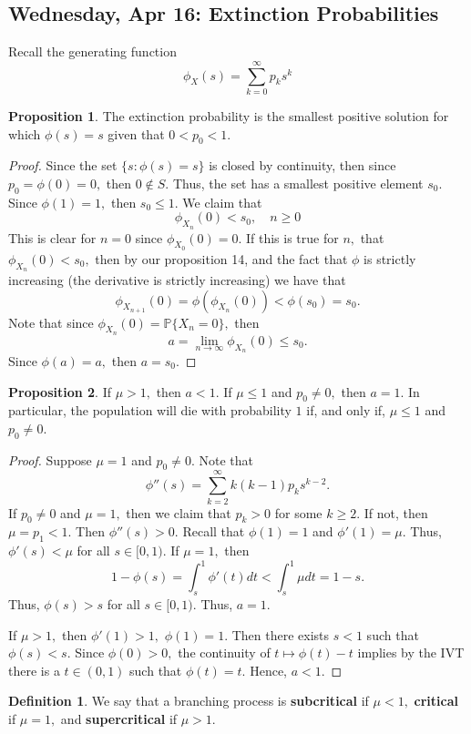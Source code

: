 \documentclass[10pt, oneside]{article}
\newcommand{\bbP}{\mathbb{P}}
\theoremstyle{definition}
\newtheorem{defn}{Definition}
\newtheorem{prop}{Proposition}
\begin{document}
\subsection{Wednesday, Apr 16: Extinction Probabilities}
Recall the generating function 
\[\phi_X (s) = \sum_{k=0}^\infty p_k s^k\]
\begin{prop}
    The extinction probability is the smallest positive solution for which $\phi(s) = s$ given that $0 < p_0 < 1.$
\end{prop}
\begin{proof}
    Since the set $\{s: \phi(s) = s\}$ is closed by continuity, then since $p_0 = \phi(0) = 0,$ then $0 \notin S.$ Thus, the set has a smallest positive element $s_0.$ Since $\phi(1) = 1,$ then $s_0 \leq 1.$ We claim that 
    \[\phi_{X_n}(0) < s_0,\quad  n\geq 0\] This is clear for $n=0$ since $\phi_{X_0}(0) = 0.$ If this is true for $n,$ that $\phi_{X_n}(0) < s_0,$ then by our proposition 14, and the fact that $\phi$ is strictly increasing (the derivative is strictly increasing) we have that 
    \[\phi_{X_{n+1}}(0) = \phi(\phi_{X_n}(0)) < \phi(s_0) = s_0.\] Note that since $\phi_{X_n}(0) = \bbP\{X_n = 0\},$ then 
    \[a = \lim_{n\to \infty}\phi_{X_n}(0) \leq s_0.\] Since $\phi(a) = a,$ then $a = s_0.$
\end{proof}
\begin{prop}
    If $\mu >1,$ then $a<1.$ If $\mu \leq 1$ and $p_0 \neq 0,$ then $a = 1.$ In particular, the population will die with probability $1$ if, and only if, $\mu \leq 1$ and $p_0 \neq 0.$
\end{prop}
\begin{proof}
    Suppose $\mu = 1$ and $p_0 \neq 0.$ Note that 
    \[\phi''(s) = \sum_{k=2}^\infty k(k-1)p_k s^{k-2}.\] If $p_0 \neq 0$ and $\mu = 1,$ then we claim that $p_k >0$ for some $k \geq 2.$ If not, then $\mu = p_1 < 1.$ Then $\phi''(s) >0.$ Recall that $\phi(1) = 1$ and $\phi'(1) = \mu.$ Thus, $\phi'(s) < \mu$ for all $s\in [0,1).$ If $\mu = 1,$ then 
    \[1 - \phi(s) = \int_s^1 \phi'(t)dt < \int_s^1 \mu dt  = 1-s.\] Thus, $\phi(s) >s$ for all $s\in [0,1).$ Thus, $a = 1. $ 

    If $\mu >1,$ then $\phi'(1) >1,$ $\phi(1) = 1.$ Then there exists $s<1$ such that $\phi(s) < s.$ Since $\phi(0) >0,$ the continuity of $t \mapsto \phi(t)-t$ implies by the IVT there is a $t\in (0,1)$ such that $\phi(t) = t.$ Hence, $a<1. $
\end{proof}

\begin{defn}
    We say that a branching process is \textbf{subcritical} if $\mu <1,$ \textbf{critical} if $\mu  = 1,$ and \textbf{supercritical} if $\mu >1.$ 
\end{defn}
\end{document}
